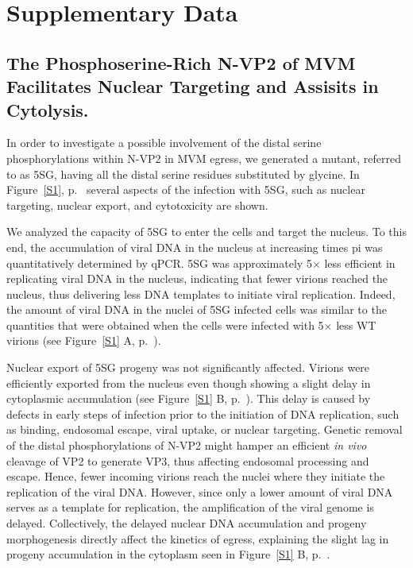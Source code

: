 
\chapter{Supplementary Data} %

\label{Results} %


\section{The Phosphoserine-Rich N-VP2 of MVM Facilitates Nuclear Targeting and Assisits in Cytolysis.}
\label{Cytoskeleton}


\renewcommand{\thefigure}{S\arabic{figure}}
\setcounter{figure}{0}

In order to investigate a possible involvement of the distal serine phosphorylations within N-VP2 in MVM egress, we generated a mutant, referred to as 5SG, having all the distal serine residues substituted by glycine. In Figure~\ref{S1}, p.~\pageref{S1} several aspects of the infection with 5SG, such as nuclear targeting, nuclear export, and cytotoxicity are shown.

We analyzed the capacity of 5SG to enter the cells and target the nucleus. To this end, the accumulation of viral DNA in the nucleus at increasing times pi was quantitatively determined by qPCR. 5SG was approximately 5$\times$ less efficient in replicating viral DNA in the nucleus, indicating that fewer virions reached the nucleus, thus delivering less DNA templates to initiate viral replication. Indeed, the amount of viral DNA in the nuclei of 5SG infected cells was similar to the quantities that were obtained when the cells were infected with 5$\times$ less WT virions (see Figure~\ref{S1} A, p.~\pageref{S1}).

Nuclear export of 5SG progeny was not significantly affected. Virions were efficiently exported from the nucleus even though showing a slight delay in cytoplasmic accumulation (see Figure~\ref{S1} B, p.~\pageref{S1}). This delay is caused by defects in early steps of infection prior to the initiation of DNA replication, such as binding, endosomal escape, viral uptake, or nuclear targeting. Genetic removal of the distal phosphorylations of N-VP2 might hamper an efficient \textit{in vivo} cleavage of VP2 to generate VP3, thus affecting endosomal processing and escape. Hence, fewer incoming virions reach the nuclei where they initiate the replication of the viral DNA. However, since only a lower amount of viral DNA serves as a template for replication, the amplification of the viral genome is delayed. Collectively, the delayed nuclear DNA accumulation and progeny morphogenesis directly affect the kinetics of egress, explaining the slight lag in progeny accumulation in the cytoplasm seen in Figure~\ref{S1} B, p.~\pageref{S1}.          
 
